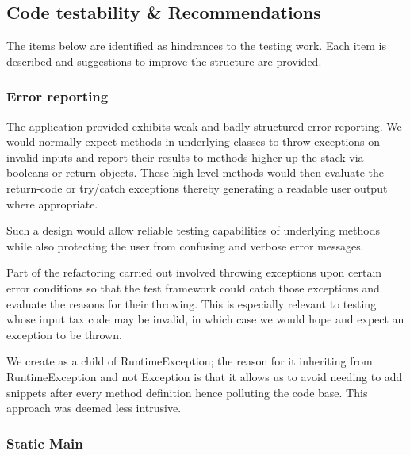\subsection{Code testability \& Recommendations}
The items below are identified as hindrances to the testing work.  Each item is described and suggestions to improve the structure are provided.

\subsubsection{Error reporting}
\label{sec:error-reporting}
The application provided exhibits weak and badly structured error reporting. We would normally expect methods in underlying classes to throw exceptions on invalid inputs and report their results to methods higher up the stack via booleans or return objects. These high level methods would then evaluate the return-code or try/catch exceptions thereby generating a readable user output where appropriate.
\par
Such a design would allow reliable testing capabilities of underlying methods while also protecting the user from confusing and verbose error messages. 
\par 
Part of the refactoring carried out involved throwing exceptions upon certain error conditions so that the test framework could catch those exceptions and evaluate the reasons for their throwing. 
This is especially relevant to testing  whose input tax code may be invalid, in which case we would hope and expect an exception to be thrown. 
\par 
We create  as a child of RuntimeException; the reason for it inheriting from RuntimeException and not Exception is that it allows us to avoid needing to add snippets  after every method definition hence polluting the code base. 
This approach was deemed less intrusive. 

\subsubsection{Static Main}

